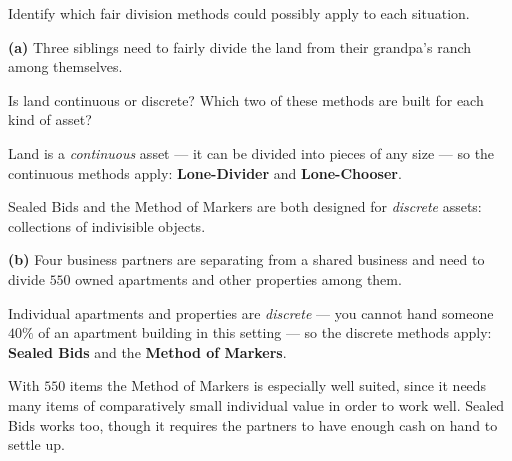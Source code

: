 \documentclass[12pt]{ximera}
\begin{document}
\begin{problem}
Identify which fair division methods could possibly apply to each situation.

\begin{prompt}
\textbf{(a)} Three siblings need to fairly divide the land from their grandpa's ranch
among themselves.

\begin{selectAll}
\end{selectAll}

\begin{hint}
Is land continuous or discrete? Which two of these methods are built for each kind of
asset?
\end{hint}

\begin{feedback}
Land is a \emph{continuous} asset --- it can be divided into pieces of any size --- so
the continuous methods apply: \textbf{Lone-Divider} and \textbf{Lone-Chooser}.

Sealed Bids and the Method of Markers are both designed for \emph{discrete} assets:
collections of indivisible objects.
\end{feedback}
\end{prompt}

\begin{prompt}
\textbf{(b)} Four business partners are separating from a shared business and need to
divide $550$ owned apartments and other properties among them.

\begin{selectAll}
\end{selectAll}

\begin{feedback}
Individual apartments and properties are \emph{discrete} --- you cannot hand someone
$40\%$ of an apartment building in this setting --- so the discrete methods apply:
\textbf{Sealed Bids} and the \textbf{Method of Markers}.

With $550$ items the Method of Markers is especially well suited, since it needs many
items of comparatively small individual value in order to work well. Sealed Bids works
too, though it requires the partners to have enough cash on hand to settle up.
\end{feedback}
\end{prompt}
\end{problem}
\end{document}
